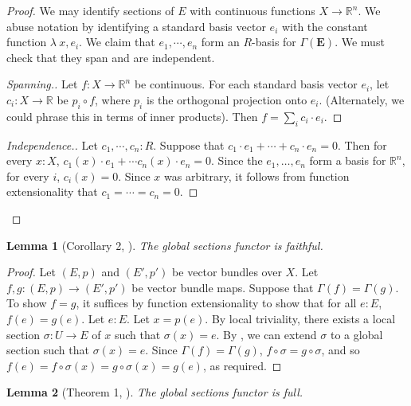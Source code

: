 \documentclass[11pt]{article}
\newcommand{\R}{\mathbb{R}}
\theoremstyle{plain}
\newtheorem{lemma}{Lemma}[section]
\theoremstyle{definition}
\begin{document}
\begin{proof}
  We may identify sections of \(E\) with continuous functions \(X \to \mathbb{R}^n\). We abuse notation by identifying a standard basis vector \(e_i\) with the constant function \(\lambda\ x, e_i\). We claim that \(e_1, \cdots, e_n\) form an \(R\)-basis for \(\Gamma(\mathbf{E})\). We must check that they span and are independent.
  \begin{proof}[Spanning.]
    Let \(f : X \to \R^n\) be continuous. For each standard basis vector \(e_i\), let \(c_i : X \to \R\) be \(p_i \circ f\), where \(p_i\) is the orthogonal projection onto \(e_i\). (Alternately, we could phrase this in terms of inner products). Then \(f = \sum_i c_i \cdot e_i\).
  \end{proof}

  \begin{proof}[Independence.]
    Let \(c_1, \cdots, c_n : R\). Suppose that \(c_1 \cdot e_1 + \cdots + c_n \cdot e_n = 0\). Then for every \(x : X\), \(c_1(x) \cdot e_1 + \cdots c_n(x) \cdot e_n = 0\). Since the \(e_1, \dots, e_n\) form a basis for \(\R^n\), for every \(i\), \(c_i(x) = 0\). Since \(x\) was arbitrary, it follows from function extensionality that \(c_1 = \cdots = c_n = 0\).
  \end{proof}
\end{proof}

\begin{lemma}[Corollary 2, \cite{swan1962vector}]\label{lemma:global-sections-faithful}
  The global sections functor is faithful.
\end{lemma}

\begin{proof}
  Let \((E,p)\) and \((E',p')\) be vector bundles over \(X\). Let \(f,g : (E,p) \to (E',p')\) be vector bundle maps. Suppose that \(\Gamma(f) = \Gamma(g)\). To show \(f = g\), it suffices by function extensionality to show that for all \(e : E\), \(f(e) = g(e)\). Let \(e : E\). Let \(x = p(e)\). By local triviality, there exists a local section \(\sigma : U \to E\) of \(x\) such that \(\sigma(x) = e\). By , we can extend \(\sigma\) to a global section such that \(\sigma (x) = e\). Since \(\Gamma(f) = \Gamma(g)\), \(f \circ \sigma = g \circ \sigma\), and so \(f(e) = f \circ \sigma(x) = g \circ \sigma(x) = g(e)\), as required.
\end{proof}

\begin{lemma}[Theorem 1, \cite{swan1962vector}]\label{lemma:global-sections-full}
  The global sections functor is full.
\end{lemma}
\end{document}
